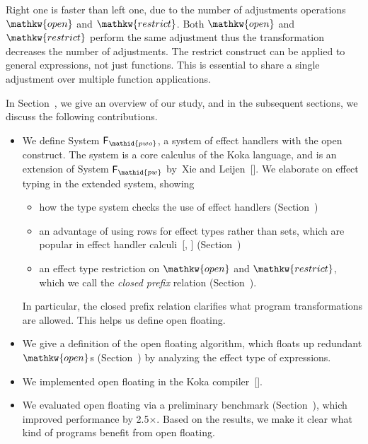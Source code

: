 \documentclass{llncs}
\begin{document}
\noindent Right one is faster than left one, due to the number of adjustments operations $\mathpre{\mathkw{open}}$ and $\mathpre{\mathkw{restrict}}$.
Both $\mathpre{\mathkw{open}}$ and $\mathpre{\mathkw{restrict}}$ perform the same adjustment thus the transformation decreases the number of adjustments.
The restrict construct can be applied to general expressions, not just functions.
This is essential to share a single
adjustment over multiple function applications.%

In Section~, we give an overview of our study, and in the subsequent sections, we discuss the following contributions.%

\begin{itemize}%

\item{}
We define System $\mathpre{\mathsf{F}_{\mathid{pwo}}}$, a system of effect handlers with the open construct.
The system is a core calculus of the Koka language, and is an extension of System $\mathpre{\mathsf{F}_{\mathid{pw}}}$ by~Xie and Leijen~[].
We elaborate on effect typing in the extended system, showing%

\begin{itemize}[noitemsep,topsep=\mdcompacttopsep]%

\item how the type system checks the use of effect handlers (Section~)%

\item an advantage of using rows for effect types rather than sets, which are popular in effect handler calculi~[, ] (Section~)%

\item an effect type restriction on $\mathpre{\mathkw{open}}$ and $\mathpre{\mathkw{restrict}}$, which we call the \emph{closed prefix} relation (Section~).%
\end{itemize}%

In particular, the closed prefix relation clarifies what program transformations are allowed. This helps us define open floating.%

\item{}
We give a definition of the open floating algorithm,
which floats up redundant $\mathpre{\mathkw{open}}$s (Section~) by analyzing the effect type of expressions.%

\item{}
We implemented open floating in the Koka compiler~[].%

\item{}
We evaluated open floating via a preliminary benchmark (Section~),
which improved performance by 2.5\ensuremath{\times}.
Based on the results, we make it clear what kind of programs benefit from open floating.%
\end{itemize}%
\end{document}
